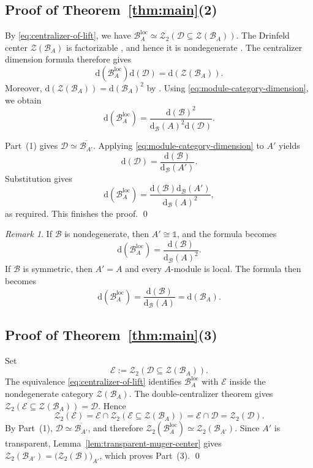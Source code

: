 \documentclass[11pt,reqno]{amsart}
\numberwithin{equation}{section}
\theoremstyle{plain}
\theoremstyle{definition}
\theoremstyle{remark}
\newtheorem{remark}[thmctr]{Remark}
\newcommand{\unit}{\mathds{1}}
\newcommand{\B}{\mathcal{B}}
\newcommand{\D}{\mathcal{D}}
\newcommand{\E}{\mathcal{E}}
\newcommand{\Z}{\mathcal{Z}}
\newcommand{\loc}{\mathrm{loc}}
\newcommand{\FP}{\mathrm{d}}
\begin{document}
\subsection{Proof of Theorem~\ref{thm:main}(2)}
By \eqref{eq:centralizer-of-lift}, we have
$\B_A^{\loc}\simeq\Z_2(\D\subseteq\Z(\B_A))$. The Drinfeld center
$\Z(\B_A)$ is factorizable
\cite[Proposition~8.6.3]{etingof2016tensor}, and hence it is nondegenerate
\cite[Theorem~4.2]{shimizu2019non}.
The centralizer dimension formula
\cite[Theorem~4.9]{shimizu2019non} therefore gives
\[
  \FP(\B_A^{\loc})\FP(\D)
  =
  \FP(\Z(\B_A)).
\]
Moreover, $\FP(\Z(\B_A))=\FP(\B_A)^2$ 
by \cite[Theorem~7.16.6]{etingof2016tensor}. Using
\eqref{eq:module-category-dimension}, we obtain
\[
  \FP(\B_A^{\loc})
  =
  \frac{\FP(\B)^2}{\FP_{\B}(A)^2\FP(\D)}.
\]

Part~(1) gives $\D\simeq\overline{\B_{A'}}$. Applying
\eqref{eq:module-category-dimension} to $A'$ yields
\[
  \FP(\D)
  =
  \frac{\FP(\B)}{\FP_{\B}(A')}.
\]
Substitution gives
\[
  \FP(\B_A^{\loc})
  =
  \frac{\FP(\B)\FP_{\B}(A')}{\FP_{\B}(A)^2},
\]
as required. This finishes the proof. \qed


\begin{remark}
If $\B$ is nondegenerate, then $A'\cong\unit$, and the formula becomes
\[
  \FP(\B_A^{\loc})
  =
  \frac{\FP(\B)}{\FP_{\B}(A)^2}.
\]
If $\B$ is symmetric, then $A'=A$ and every $A$-module is local. The formula
then becomes
\[
  \FP(\B_A^{\loc})
  =
  \frac{\FP(\B)}{\FP_{\B}(A)}
  =
  \FP(\B_A).
\]
\end{remark}


\subsection{Proof of Theorem~\ref{thm:main}(3)}
Set
\[
  \E:=\Z_2(\D\subseteq\Z(\B_A)).
\]
The equivalence \eqref{eq:centralizer-of-lift} identifies
$\B_A^{\loc}$ with $\E$ inside the nondegenerate category $\Z(\B_A)$.
The double-centralizer theorem \cite[Theorem~4.9]{shimizu2019non} gives 
$\Z_2(\E\subseteq\Z(\B_A))=\D$. 
Hence
\[
  \Z_2(\E) = \E\cap\Z_2(\E\subseteq\Z(\B_A)) = \E\cap\D = \Z_2(\D).
\]
By Part~(1), $\D\simeq\overline{\B_{A'}}$, and therefore
$\Z_2(\B_A^{\loc}) \simeq \Z_2(\B_{A'})$. 
Since $A'$ is transparent, Lemma~\ref{lem:transparent-muger-center} gives
$\Z_2(\B_{A'})=\bigl(\Z_2(\B)\bigr)_{A'}$, 
which proves Part~(3). \qed
\end{document}
